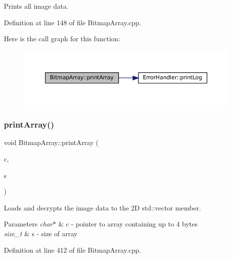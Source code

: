 Prints all image data. 



Definition at line 148 of file Bitmap\+Array.\+cpp.

Here is the call graph for this function\+:\nopagebreak
\begin{figure}[H]
\begin{center}
\leavevmode
\includegraphics[width=350pt]{classBitmapArray_a0580ddeedca7f59fd8d43ec92e6bb4a1_cgraph}
\end{center}
\end{figure}
\mbox{\label{classBitmapArray_a99a8a164e51e29407f24dab4752232c1}} 
\subsubsection{\texorpdfstring{printArray()}{printArray()}\hspace{0.1cm}{\footnotesize\ttfamily [2/2]}}
{\footnotesize\ttfamily void Bitmap\+Array\+::print\+Array (\begin{DoxyParamCaption}\item[{char $\ast$}]{c,  }\item[{size\+\_\+t}]{s }\end{DoxyParamCaption})\hspace{0.3cm}{\ttfamily [private]}}



Loads and decrypts the image data to the 2D std\+::vector member. 


\begin{DoxyParams}{Parameters}
{\em char$\ast$} & c -\/ pointer to array containing up to 4 bytes \\
\hline
{\em size\+\_\+t} & s -\/ size of array \\
\hline
\end{DoxyParams}


Definition at line 412 of file Bitmap\+Array.\+cpp.

